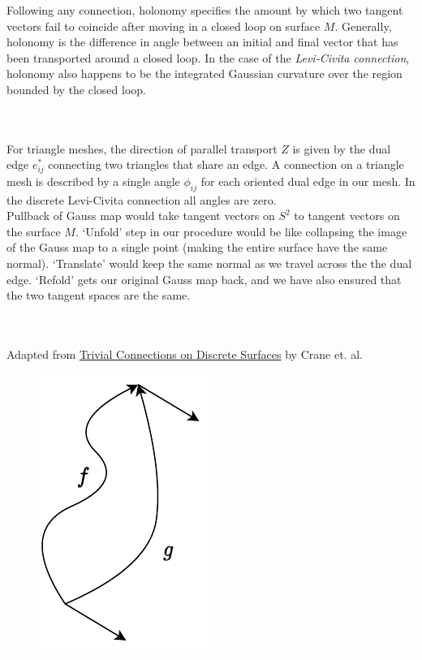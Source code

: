 \documentclass{article}
\begin{document}
Following any connection, holonomy specifies the amount by which two tangent vectors fail to coincide after moving 
in a closed loop on surface $M$. Generally, holonomy is the difference in angle between an initial and final vector
that has been transported around a closed loop. In the case of the \emph{Levi-Civita connection}, holonomy
also happens to be the integrated Gaussian curvature over the region bounded by the closed loop.

\vspace{1.8cm}
\\\\

For triangle meshes, the direction of parallel transport $Z$ is given by the dual edge $e^*_{ij}$
connecting two triangles that share an edge. A connection on a triangle mesh is described by a single angle $\phi_{ij}$
for each oriented dual edge in our mesh. In the discrete Levi-Civita connection all angles are zero. \\

Pullback of Gauss map would take tangent vectors on $S^2$ to tangent vectors on the surface $M$. `Unfold' step
in our procedure would be like collapsing the image of the Gauss map to a single point (making the entire surface have 
the same normal). `Translate' would keep the same normal as we travel across the the dual edge. `Refold' gets our original
Gauss map back, and we have also ensured that the two tangent spaces are the same.


\vspace{1.8cm}
\\\\


Adapted from \href{https://www.cs.cmu.edu/~kmcrane/Projects/TrivialConnections/}{Trivial Connections on Discrete Surfaces}
by Crane et. al. \\

\begin{figure}[h]
    \centering
    \includegraphics[scale=0.5]{figs/loop.pdf}
\end{figure}
\end{document}
